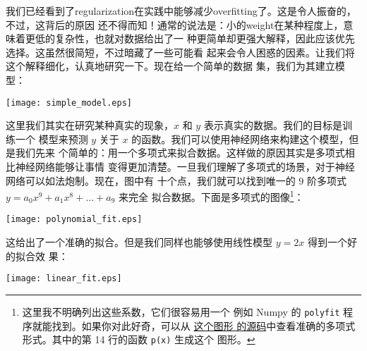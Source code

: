 %
%
% 

我们已经看到了\gls*{regularization}在实践中能够减少\gls*{overfitting}了。这是令人振奋的，不过，这背后的原因
还不得而知！通常的说法是：小的\gls*{weight}在某种程度上，意味着更低的复杂性，也就对数据给出了一
种更简单却更强大解释，因此应该优先选择。这虽然很简短，不过暗藏了一些可能看
起来会令人困惑的因素。让我们将这个解释细化，认真地研究一下。现在给一个简单的数据
集，我们为其建立模型：
\begin{center}
  \texttt{[image: simple\_model.eps]}
\end{center}
	
这里我们其实在研究某种真实的现象，$x$ 和 $y$ 表示真实的数据。我们的目标是训练一个
模型来预测 $y$ 关于 $x$ 的函数。我们可以使用神经网络来构建这个模型，但是我们先来
个简单的：用一个多项式来拟合数据。这样做的原因其实是多项式相比神经网络能够让事情
变得更加清楚。一旦我们理解了多项式的场景，对于神经网络可以如法炮制。现在，图中有
十个点，我们就可以找到唯一的 $9$ 阶多项式 $y=a_0x^9 + a_1x^8 + ... + a_9$ 来完全
拟合数据。下面是多项式的图像\footnote{这里我不明确列出这些系数，它们很容易用一个
  例如 Numpy 的 \lstinline!polyfit! 程序就能找到。如果你对此好奇，可以从%
  \href{http://neuralnetworksanddeeplearning.com/js/polynomial_model.js}{这个图形
    的源码}中查看准确的多项式形式。其中的第 14 行的函数 \lstinline!p(x)! 生成这个
  图形。}：
\begin{center}
  \texttt{[image: polynomial\_fit.eps]}
\end{center}

这给出了一个准确的拟合。但是我们同样也能够使用线性模型 $y=2x$ 得到一个好的拟合效
果：
\begin{center}
  \texttt{[image: linear\_fit.eps]}
\end{center}


